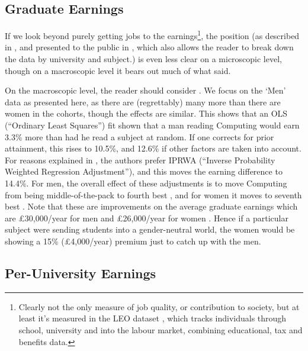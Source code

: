 \documentclass[sigconf]{acmart}
\begin{document}
\subsection{Graduate Earnings}
If we look beyond purely getting jobs to the earnings\footnote{Clearly
not the only measure of job quality, or contribution to society, but
at least it's measured in the LEO dataset
\cite{DfE2017a}, which tracks individuals through school, university
and into the labour market, combining educational, tax and benefits
data.}, the position (as described in \cite{DfE2018d}, and presented
to the public in \cite{BBC2018f}, which also allows the reader to
break down the data by university and subject.) is even less clear on
a microscopic level, though on a macroscopic level it bears out much
of what \cite{Shadbolt2016a} said.

On the macroscopic level, the reader should consider \cite[Table
5]{DfE2018d}. We focus on the `Men' data as presented here, as there
are (regrettably) many more than there are women in the cohorts,
though the effects are similar. This shows that an OLS (``Ordinary
Least Squares'') fit shown that a man reading Computing would earn
3.3\% more than had he read a subject at random. If one corrects for
prior attainment, this rises to 10.5\%, and 12.6\% if other factors
are taken into account. For reasons explained in
\cite[\S4.2]{DfE2018d}, the authors prefer IPRWA (``Inverse
Probability Weighted Regression Adjustment''), and this moves the
earning difference to 14.4\%. For men, the overall effect of these
adjustments is to move Computing from being middle-of-the-pack
\cite[Figure 15]{DfE2018d} to fourth best \cite[Figure 17]{DfE2018d},
and for women it moves to seventh best \cite[Figure
16]{DfE2018d}. Note that these are improvements on the average
graduate earnings which are \pounds30,000/year for men and
\pounds26,000/year for women \cite[p. 37]{DfE2018d}. Hence if a
particular subject were sending students into a gender-neutral world,
the women would be showing a 15\% (\pounds4,000/year) premium just to
catch up with the men.

\subsection{Per-University Earnings}
\end{document}
